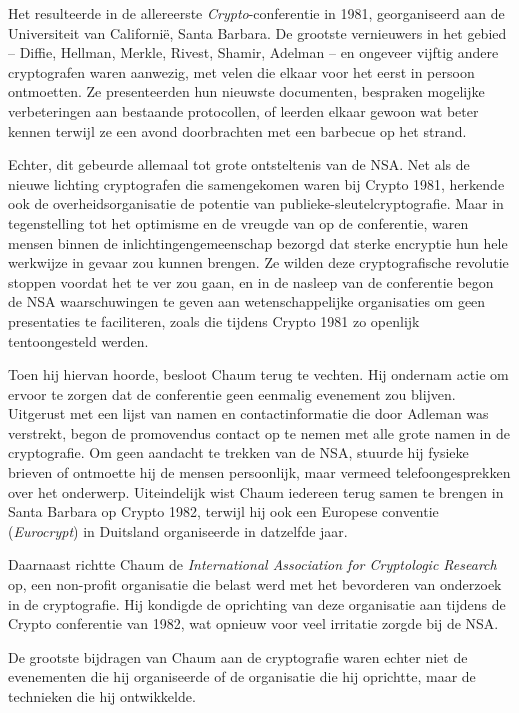\documentclass[
  a5paper,
  smalldemyvopaper,11pt,twoside,onecolumn,openright,extrafontsizes,
hidelinks]{memoir}
\begin{document}
Het resulteerde in de allereerste \emph{Crypto}-conferentie in 1981,
georganiseerd aan de Universiteit van Californië, Santa Barbara. De
grootste vernieuwers in het gebied -- Diffie, Hellman, Merkle, Rivest,
Shamir, Adelman -- en ongeveer vijftig andere cryptografen waren
aanwezig, met velen die elkaar voor het eerst in persoon ontmoetten. Ze
presenteerden hun nieuwste documenten, bespraken mogelijke verbeteringen
aan bestaande protocollen, of leerden elkaar gewoon wat beter kennen
terwijl ze een avond doorbrachten met een barbecue op het strand.

Echter, dit gebeurde allemaal tot grote ontsteltenis van de NSA. Net als
de nieuwe lichting cryptografen die samengekomen waren bij Crypto 1981,
herkende ook de overheidsorganisatie de potentie van
publieke-sleutelcryptografie. Maar in tegenstelling tot het optimisme en
de vreugde van op de conferentie, waren mensen binnen de
inlichtingengemeenschap bezorgd dat sterke encryptie hun hele werkwijze
in gevaar zou kunnen brengen. Ze wilden deze cryptografische revolutie
stoppen voordat het te ver zou gaan, en in de nasleep van de conferentie
begon de NSA waarschuwingen te geven aan wetenschappelijke organisaties
om geen presentaties te faciliteren, zoals die tijdens Crypto 1981 zo
openlijk tentoongesteld werden.

Toen hij hiervan hoorde, besloot Chaum terug te vechten. Hij ondernam
actie om ervoor te zorgen dat de conferentie geen eenmalig evenement zou
blijven. Uitgerust met een lijst van namen en contactinformatie die door
Adleman was verstrekt, begon de promovendus contact op te nemen met alle
grote namen in de cryptografie. Om geen aandacht te trekken van de NSA,
stuurde hij fysieke brieven of ontmoette hij de mensen persoonlijk, maar
vermeed telefoongesprekken over het onderwerp. Uiteindelijk wist Chaum
iedereen terug samen te brengen in Santa Barbara op Crypto 1982, terwijl
hij ook een Europese conventie (\emph{Eurocrypt}) in Duitsland
organiseerde in datzelfde jaar.

Daarnaast richtte Chaum de \emph{International Association for
Cryptologic Research} op, een non-profit organisatie die belast werd met
het bevorderen van onderzoek in de cryptografie. Hij kondigde de
oprichting van deze organisatie aan tijdens de Crypto conferentie van
1982, wat opnieuw voor veel irritatie zorgde bij de NSA.

De grootste bijdragen van Chaum aan de cryptografie waren echter niet de
evenementen die hij organiseerde of de organisatie die hij oprichtte,
maar de technieken die hij ontwikkelde.
\end{document}
